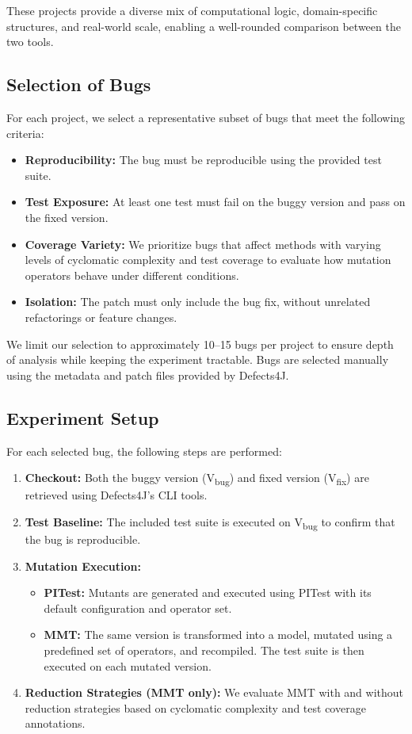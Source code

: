\documentclass[12pt,a4paper]{article}
\begin{document}
These projects provide a diverse mix of computational logic, domain-specific structures, and real-world scale, enabling a well-rounded comparison between the two tools.

\subsection{Selection of Bugs}

For each project, we select a representative subset of bugs that meet the following criteria:

\begin{itemize}
\item \textbf{Reproducibility:} The bug must be reproducible using the provided test suite.
\item \textbf{Test Exposure:} At least one test must fail on the buggy version and pass on the fixed version.
\item \textbf{Coverage Variety:} We prioritize bugs that affect methods with varying levels of cyclomatic complexity and test coverage to evaluate how mutation operators behave under different conditions.
\item \textbf{Isolation:} The patch must only include the bug fix, without unrelated refactorings or feature changes.
\end{itemize}

We limit our selection to approximately 10–15 bugs per project to ensure depth of analysis while keeping the experiment tractable. Bugs are selected manually using the metadata and patch files provided by Defects4J.

\subsection{Experiment Setup}

For each selected bug, the following steps are performed:

\begin{enumerate}
\item \textbf{Checkout:} Both the buggy version (V\textsubscript{bug}) and fixed version (V\textsubscript{fix}) are retrieved using Defects4J's CLI tools.
\item \textbf{Test Baseline:} The included test suite is executed on V\textsubscript{bug} to confirm that the bug is reproducible.
\item \textbf{Mutation Execution:}
\begin{itemize}
\item \textbf{PITest:} Mutants are generated and executed using PITest with its default configuration and operator set.
\item \textbf{MMT:} The same version is transformed into a model, mutated using a predefined set of operators, and recompiled. The test suite is then executed on each mutated version.
\end{itemize}
\item \textbf{Reduction Strategies (MMT only):} We evaluate MMT with and without reduction strategies based on cyclomatic complexity and test coverage annotations.
\end{enumerate}
\end{document}
